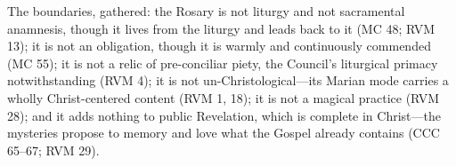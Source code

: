 The boundaries, gathered: the Rosary is not liturgy and not
sacramental anamnesis, though it lives from the liturgy and leads back
to it (MC 48; RVM 13); it is not an obligation, though it is warmly and
continuously commended (MC 55); it is not a relic of pre-conciliar
piety, the Council's liturgical primacy notwithstanding (RVM 4); it is
not un-Christological---its Marian mode carries a wholly
Christ-centered content (RVM 1, 18); it is not a magical practice (RVM
28); and it adds nothing to public Revelation, which is complete in
Christ---the mysteries propose to memory and love what the Gospel
already contains (CCC 65--67; RVM 29).
